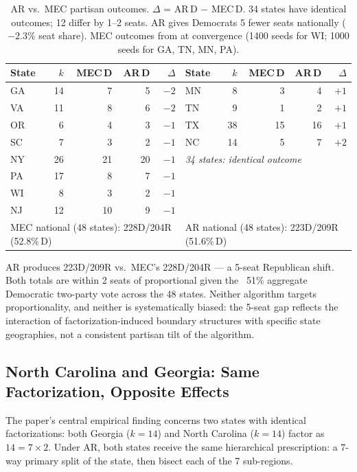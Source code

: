 \begin{table}[h]
\centering\small
\begin{tabular}{lrrrr|lrrrr}
\toprule
State & $k$ & MEC\,D & AR\,D & $\Delta$ &
State & $k$ & MEC\,D & AR\,D & $\Delta$ \\
\midrule
GA & 14 & 7 & 5 & $-2$ & MN & 8  & 3  & 4  & $+1$ \\
VA & 11 & 8 & 6 & $-2$ & TN & 9  & 1  & 2  & $+1$ \\
OR &  6 & 4 & 3 & $-1$ & TX & 38 & 15 & 16 & $+1$ \\
SC &  7 & 3 & 2 & $-1$ & NC & 14 & 5  & 7  & $+2$ \\
NY & 26 & 21& 20& $-1$ & \multicolumn{5}{l}{\emph{34 states: identical outcome}} \\
PA & 17 & 8 & 7 & $-1$ & & & & & \\
WI &  8 & 3 & 2 & $-1$ & & & & & \\
NJ & 12 & 10& 9 & $-1$ & & & & & \\
\midrule
\multicolumn{5}{l|}{MEC national (48 states): 228D/204R (52.8\%\,D)} &
\multicolumn{5}{l}{AR national (48 states): 223D/209R (51.6\%\,D)} \\
\bottomrule
\end{tabular}
\caption{AR vs.\ MEC partisan outcomes. $\Delta$ = AR\,D $-$ MEC\,D.
  34 states have identical outcomes; 12 differ by 1--2 seats. AR gives
  Democrats 5 fewer seats nationally ($-2.3\%$ seat share).
  MEC outcomes from \citet{dellaLibera2026mec} at convergence
  (1400 seeds for WI; 1000 seeds for GA, TN, MN, PA).}
\label{tab:national-pfr-mec}
\end{table}

AR produces 223D/209R vs.\ MEC's 228D/204R --- a 5-seat Republican shift.
Both totals are within 2 seats of proportional given the ~51\% aggregate
Democratic two-party vote across the 48 states. Neither algorithm targets
proportionality, and neither is systematically biased: the 5-seat gap reflects
the interaction of factorization-induced boundary structures with specific
state geographies, not a consistent partisan tilt of the algorithm.

\subsection{North Carolina and Georgia: Same Factorization, Opposite Effects}
\label{sec:eval:nc-ga}

The paper's central empirical finding concerns two states with identical
factorizations: both Georgia ($k=14$) and North Carolina ($k=14$) factor as
$14 = 7 \times 2$. Under AR, both states receive the same hierarchical
prescription: a 7-way primary split of the state, then bisect each of the 7
sub-regions.

